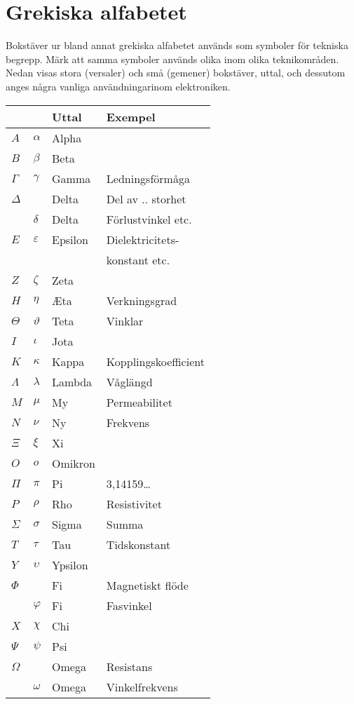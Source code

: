 \section{Grekiska alfabetet}

Bokstäver ur bland annat grekiska alfabetet används som symboler för
tekniska begrepp.  Märk att samma symboler används olika inom olika
teknikområden. Nedan visas stora (versaler) och små (gemener)
bokstäver, uttal, och dessutom anges några vanliga användningarinom
elektroniken.

\bigskip
  \begin{tabular}{ll|l|l}
        &    & Uttal & Exempel \\
    \hline
    \(A\) & \(\alpha\) & Alpha & \\
    \(B\) & \(\beta\) & Beta & \\
    \(\Gamma\) & \(\gamma\) & Gamma & Ledningsförmåga \\
    \(\Delta\) & & Delta & Del av .. storhet \\
    & \(\delta\) & Delta & Förlustvinkel etc. \\
    \(E\) & \(\varepsilon\) & Epsilon & Dielektricitets-\\
    & & & konstant etc.\\
    \(Z\) & \(\zeta\) & Zeta & \\
    \(H\) & \(\eta\) & \AE ta & Verkningsgrad\\
    \(\Theta\) & \(\vartheta\) & Teta & Vinklar \\
    \(I\) & \(\iota\) & Jota & \\
    \(K\) & \(\kappa\) & Kappa & Kopplingskoefficient \\
    \(\Lambda\) & \(\lambda\) & Lambda & Våglängd \\
    \(M\) & \(\mu\) & My & Permeabilitet \\
    \(N\) & \(\nu\) & Ny & Frekvens \\
    \(\Xi\) & \(\xi\) & Xi & \\
    \(O\) & \(o\) & Omikron & \\
    \(\Pi\) & \(\pi\) & Pi & 3,14159\dots \\
    \(P\) & \(\rho\) & Rho & Resistivitet \\
    \(\Sigma\) & \(\sigma\) & Sigma & Summa \\
    \(T\) & \(\tau\) & Tau & Tidskonstant \\
    \(Y\) & \(\upsilon\) & Ypsilon &  \\
    \(\Phi\) & & Fi & Magnetiskt flöde \\
    & \(\varphi\) & Fi & Fasvinkel \\
    \(X\) & \(\chi\) & Chi & \\
    \(\Psi\) & \(\psi\) & Psi & \\
    \(\Omega\) & & Omega & Resistans \\
    & \(\omega\) & Omega & Vinkelfrekvens \\
  \end{tabular}
